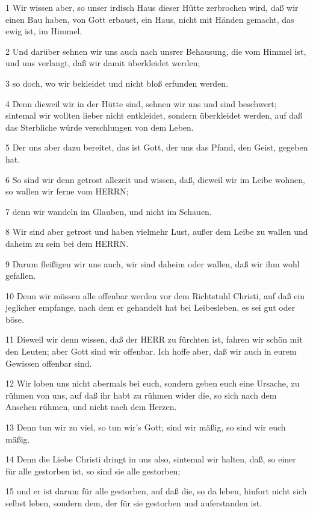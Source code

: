 \par 1 Wir wissen aber, so unser irdisch Haus dieser Hütte zerbrochen wird, daß wir einen Bau haben, von Gott erbauet, ein Haus, nicht mit Händen gemacht, das ewig ist, im Himmel.
\par 2 Und darüber sehnen wir uns auch nach unsrer Behausung, die vom Himmel ist, und uns verlangt, daß wir damit überkleidet werden;
\par 3 so doch, wo wir bekleidet und nicht bloß erfunden werden.
\par 4 Denn dieweil wir in der Hütte sind, sehnen wir uns und sind beschwert; sintemal wir wollten lieber nicht entkleidet, sondern überkleidet werden, auf daß das Sterbliche würde verschlungen von dem Leben.
\par 5 Der uns aber dazu bereitet, das ist Gott, der uns das Pfand, den Geist, gegeben hat.
\par 6 So sind wir denn getrost allezeit und wissen, daß, dieweil wir im Leibe wohnen, so wallen wir ferne vom HERRN;
\par 7 denn wir wandeln im Glauben, und nicht im Schauen.
\par 8 Wir sind aber getrost und haben vielmehr Lust, außer dem Leibe zu wallen und daheim zu sein bei dem HERRN.
\par 9 Darum fleißigen wir uns auch, wir sind daheim oder wallen, daß wir ihm wohl gefallen.
\par 10 Denn wir müssen alle offenbar werden vor dem Richtstuhl Christi, auf daß ein jeglicher empfange, nach dem er gehandelt hat bei Leibesleben, es sei gut oder böse.
\par 11 Dieweil wir denn wissen, daß der HERR zu fürchten ist, fahren wir schön mit den Leuten; aber Gott sind wir offenbar. Ich hoffe aber, daß wir auch in eurem Gewissen offenbar sind.
\par 12 Wir loben uns nicht abermals bei euch, sondern geben euch eine Ursache, zu rühmen von uns, auf daß ihr habt zu rühmen wider die, so sich nach dem Ansehen rühmen, und nicht nach dem Herzen.
\par 13 Denn tun wir zu viel, so tun wir's Gott; sind wir mäßig, so sind wir euch mäßig.
\par 14 Denn die Liebe Christi dringt in uns also, sintemal wir halten, daß, so einer für alle gestorben ist, so sind sie alle gestorben;
\par 15 und er ist darum für alle gestorben, auf daß die, so da leben, hinfort nicht sich selbst leben, sondern dem, der für sie gestorben und auferstanden ist.
